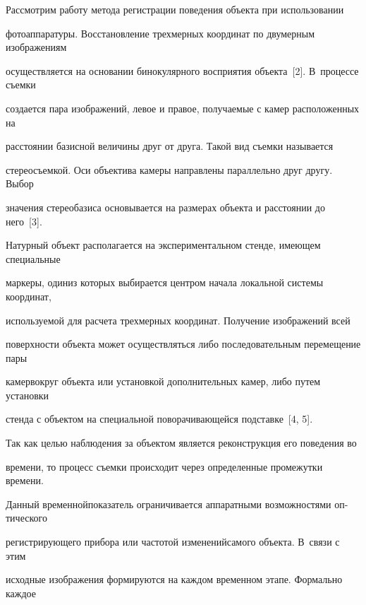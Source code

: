 




Рассмотрим работу метода регистрации поведения объекта при использовании 


фотоаппаратуры. Восстановление трехмерных координат по двумерным изображениям 


осуществляется на основании бинокулярного восприятия объекта~[2]. В~процессе съемки 


создается пара изображений, левое и правое, получаемые с камер расположенных на 


расстоянии базисной величины друг от друга. Такой вид съемки называется 


стереосъемкой. Оси объектива камеры направлены параллельно друг другу. Выбор 


значения стереобазиса основывается на размерах объекта и расстоянии до него~[3]. 


Натурный объект располагается на экспериментальном стенде, имеющем специальные 


маркеры, один\linebreak из которых выбирается центром начала локальной системы координат, 


используемой для расчета трехмерных координат. Получение изображений всей 


поверхности объекта может осуществляться либо последовательным перемещение пары 


камер\linebreak вокруг объекта или установкой дополнительных камер, либо путем установки 


стенда с объектом на специальной поворачивающейся подставке~[4, 5].





Так как целью наблюдения за объектом является реконструкция его поведения во 


времени, то процесс съемки происходит через определенные промежутки времени. 


Данный временной\linebreak показатель ограничивается аппаратными возможностями оп-\linebreak тического 


регистрирующего прибора или частотой изменений\linebreak самого объекта. В~связи с этим 


исходные изображения формируются на каждом временном этапе. Формально каждое 


